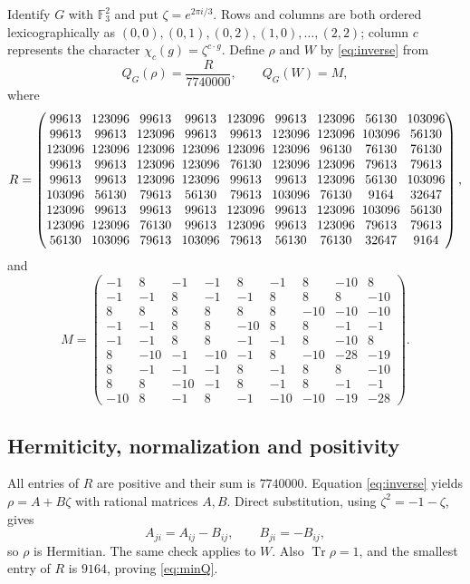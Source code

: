 \documentclass[11pt,a4paper]{article}
\theoremstyle{definition}
\theoremstyle{plain}
\DeclareMathOperator{\Tr}{Tr}
\newcommand{\F}{\mathbb F}
\begin{document}
Identify $G$ with $\F_3^2$ and put $\zeta=e^{2\pi i/3}$. Rows and columns
are both ordered lexicographically as
$(0,0),(0,1),(0,2),(1,0),\ldots,(2,2)$; column $c$ represents the character
$\chi_c(g)=\zeta^{c\cdot g}$.
Define $\rho$ and $W$ by \eqref{eq:inverse} from
\begin{equation}\label{eq:Rdef}
 Q_G(\rho)=\frac{R}{7740000},\qquad Q_G(W)=M,
\end{equation}
where
\begin{equation}\label{eq:R}
\begingroup\setlength{\arraycolsep}{2.8pt}
R=\begin{pmatrix}
99613&123096&99613&99613&123096&99613&123096&56130&103096\\
99613&99613&123096&99613&99613&123096&123096&103096&56130\\
123096&123096&123096&123096&123096&123096&96130&76130&76130\\
99613&99613&123096&123096&76130&123096&123096&79613&79613\\
99613&99613&123096&123096&99613&99613&123096&56130&103096\\
103096&56130&79613&56130&79613&103096&76130&9164&32647\\
123096&99613&99613&99613&123096&99613&123096&103096&56130\\
123096&123096&76130&99613&123096&99613&123096&79613&79613\\
56130&103096&79613&103096&79613&56130&76130&32647&9164
\end{pmatrix},
\endgroup
\end{equation}
and
\begin{equation}\label{eq:M}
M=\begin{pmatrix}
-1&8&-1&-1&8&-1&8&-10&8\\
-1&-1&8&-1&-1&8&8&8&-10\\
8&8&8&8&8&8&-10&-10&-10\\
-1&-1&8&8&-10&8&8&-1&-1\\
-1&-1&8&8&-1&-1&8&-10&8\\
8&-10&-1&-10&-1&8&-10&-28&-19\\
8&-1&-1&-1&8&-1&8&8&-10\\
8&8&-10&-1&8&-1&8&-1&-1\\
-10&8&-1&8&-1&-10&-10&-19&-28
\end{pmatrix}.
\end{equation}

\subsection{Hermiticity, normalization and positivity}
All entries of $R$ are positive and their sum is $7740000$.
Equation \eqref{eq:inverse} yields $\rho=A+B\zeta$ with rational matrices
$A,B$. Direct substitution, using $\zeta^2=-1-\zeta$, gives
\[
 A_{ji}=A_{ij}-B_{ij},\qquad B_{ji}=-B_{ij},
\]
so $\rho$ is Hermitian. The same check applies to $W$. Also $\Tr\rho=1$,
and the smallest entry of $R$ is $9164$, proving \eqref{eq:minQ}.
\end{document}
